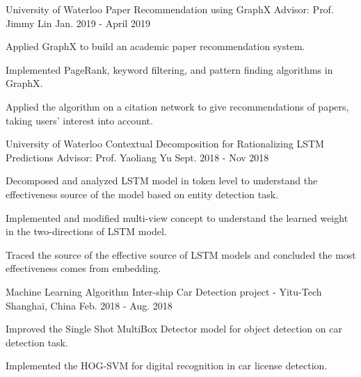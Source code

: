 \begin{cventries}
  \cventry
    {University of Waterloo}
    {Paper Recommendation using GraphX} %
    {Advisor: Prof. Jimmy Lin} %
    {Jan. 2019 - April 2019} %
    {
      \begin{cvitems} %
        \item {Applied GraphX to build an academic paper recommendation system.}
        \item {Implemented PageRank, keyword filtering, and pattern finding algorithms in GraphX.}
        \item {Applied the algorithm on a citation network to give recommendations of papers, taking users’ interest into account. }
      \end{cvitems}
    }

\cventry
    {University of Waterloo}
    {Contextual Decomposition for Rationalizing LSTM Predictions} %
    {Advisor: Prof. Yaoliang Yu} %
    {Sept. 2018 - Nov 2018} %
    {
      \begin{cvitems} %
        \item {Decomposed and analyzed LSTM model in token level to understand the effectiveness source of the model based on entity detection task.}
        \item {Implemented and modified multi-view concept to understand the learned weight in the two-directions of LSTM model.}
        \item {Traced the source of the effective source of LSTM models and concluded the most effectiveness comes from embedding.}
      \end{cvitems}
    }
    
    \cventry
    {Machine Learning Algorithm Inter-ship} %
    {Car Detection project - Yitu-Tech} %
    {Shanghai, China} %
    {Feb. 2018 - Aug. 2018} %
    {
      \begin{cvitems} %
        \item {Improved the Single Shot MultiBox Detector model for object detection on car detection task.}
        \item {Implemented the HOG-SVM for digital recognition in car license detection.}
      \end{cvitems}
    }
    

\end{cventries}
